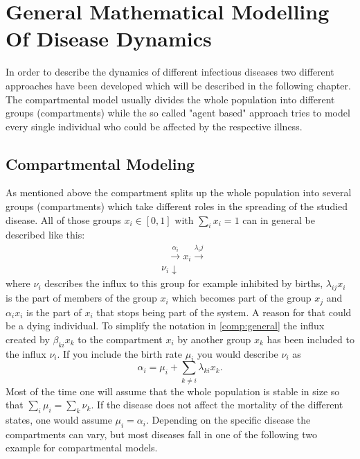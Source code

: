 \section{General Mathematical Modelling Of Disease Dynamics}
\label{chap:generalModeling}
In order to describe the dynamics of different infectious diseases two different approaches have been developed which will be described in the following chapter.
The compartmental model usually divides the whole population into different groups (compartments) while the so called "agent based" approach tries to model every single individual who could be affected by the respective illness. 
\subsection{Compartmental Modeling}
As mentioned above the compartment splits up the whole population into several groups (compartments) which take different roles in the spreading of the studied disease.
All of those groups $x_i \in [0,1] \text{ with } \sum_i x_i =1 $ can in general be described like this:
\begin{eqnarray}
&\text{     }\xrightarrow{\alpha_i}  x_i \xrightarrow{\lambda_ij}   \label{comp:general} \\
&{\nu_i} \downarrow  \nonumber
\end{eqnarray}
where $\nu_i$ describes the influx to this group for example inhibited by births, $\lambda_{ij} x_i$ is the part of members of the group $x_i$ which becomes part of the group $x_j$ and $\alpha_i x_i$ is the part of $x_i$ that stops being part of the system. A reason for that could be a dying individual. To simplify the notation in \ref{comp:general} the influx created by $\beta_{ki} x_k$ to the compartment $x_i$ by another group $x_k$ has been included to the influx $\nu_i$. If you include the birth rate $\mu_i$ you would describe $\nu_i$ as 
\begin{equation}
\alpha_i = \mu_i + \sum_{k\neq i}{}\lambda_{ki} x_k.
\end{equation}
Most of the time one will assume that the whole population is stable in size so that $\sum_i \mu_i = \sum_{k} \nu_k$. If the disease does not affect the mortality of the different states, one would assume $\mu_i = \alpha_i$.
Depending on the specific disease the compartments can vary, but most diseases fall in one of the following two example for compartmental models.
